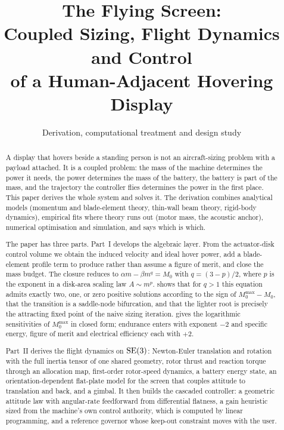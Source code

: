 \documentclass[11pt,twoside]{article}
\title{\bfseries The Flying Screen:\\
Coupled Sizing, Flight Dynamics and Control\\
of a Human-Adjacent Hovering Display}
\author{Derivation, computational treatment and design study}
\date{}
\begin{document}
\maketitle

\begin{abstract}
\noindent
A display that hovers beside a standing person is not an aircraft-sizing
problem with a payload attached. It is a coupled problem: the mass of the
machine determines the power it needs, the power determines the mass of the
battery, the battery is part of the mass, and the trajectory the controller
flies determines the power in the first place. This paper derives the whole
system and solves it. The derivation combines analytical models (momentum and
blade-element theory, thin-wall beam theory, rigid-body dynamics), empirical
fits where theory runs out (motor mass, the acoustic anchor), numerical
optimisation and simulation, and says which is which.

The paper has three parts. Part~I develops the algebraic layer. From the
actuator-disk control volume we
obtain the induced velocity and ideal hover power, add a blade-element profile
term to produce rather than assume a figure of merit, and close the mass
budget. The closure reduces to $\alpha m - \beta m^{q} = M_0$ with
$q = (3-p)/2$, where $p$ is the exponent in a disk-area scaling law
$A \sim m^{p}$.  shows that for $q>1$ this equation admits
exactly two, one, or zero positive solutions according to the sign of
$M_0^{\max} - M_0$, that the transition is a saddle-node bifurcation, and that
the lighter root is precisely the attracting fixed point of the naive sizing
iteration.  gives the logarithmic sensitivities of
$M_0^{\max}$ in closed form; endurance enters with exponent $-2$ and specific
energy, figure of merit and electrical efficiency each with $+2$.

Part~II derives the flight dynamics on $\mathrm{SE}(3)$: Newton-Euler translation
and rotation with the full inertia tensor of one shared geometry, rotor thrust
and reaction torque through an allocation map, first-order rotor-speed
dynamics, a battery energy state, an orientation-dependent flat-plate model for
the screen that couples attitude to translation and back, and a gimbal. It then
builds the cascaded controller: a geometric attitude law with angular-rate
feedforward from differential flatness, a gain heuristic sized from the
machine's own control authority, which is computed by linear programming, and a
reference governor whose keep-out constraint moves with the user.


\end{abstract}
\end{document}

